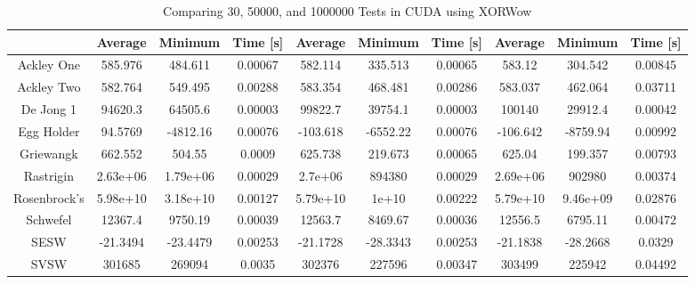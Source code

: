 \documentclass{article}
\begin{document}
        \begin{table}[h]
            \begin{centering}
                \begin{tabular}{|c||c|c|c||c|c|c||c|c|c|}
                    \hline
                                & Average & Minimum & Time [s] & Average & Minimum & Time [s] & Average & Minimum & Time [s] \\
                    \hline
                    \hline
                    Ackley One & 585.976 & 484.611 & 0.00067 & 582.114 & 335.513 & 0.00065 & 583.12 & 304.542 & 0.00845 \\ 
                    \hline
                    Ackley Two & 582.764 & 549.495 & 0.00288 & 583.354 & 468.481 & 0.00286 & 583.037 & 462.064 & 0.03711 \\
                    \hline
                    De Jong 1 & 94620.3 & 64505.6 & 0.00003 & 99822.7 & 39754.1 & 0.00003 & 100140 & 29912.4 & 0.00042\\
                    \hline
                    Egg Holder & 94.5769 & -4812.16 & 0.00076 & -103.618 & -6552.22 & 0.00076 & -106.642 & -8759.94 & 0.00992 \\
                    \hline
                    Griewangk & 662.552 & 504.55 & 0.0009 & 625.738 & 219.673 & 0.00065 & 625.04 & 199.357 & 0.00793 \\
                    \hline
                    Rastrigin & 2.63e+06 & 1.79e+06 & 0.00029 & 2.7e+06 & 894380 & 0.00029 & 2.69e+06 & 902980 & 0.00374 \\
                    \hline
                    Rosenbrock's & 5.98e+10 & 3.18e+10 & 0.00127 & 5.79e+10 & 1e+10 & 0.00222 & 5.79e+10 & 9.46e+09 & 0.02876\\
                    \hline
                    Schwefel & 12367.4 & 9750.19 & 0.00039 & 12563.7 & 8469.67 & 0.00036 & 12556.5 & 6795.11 & 0.00472 \\
                    \hline
                    SESW & -21.3494 & -23.4479 & 0.00253 & -21.1728 & -28.3343 & 0.00253 & -21.1838 & -28.2668 & 0.0329 \\
                    \hline
                    SVSW & 301685 & 269094 & 0.0035 & 302376 & 227596 & 0.00347 & 303499 & 225942 & 0.04492 \\
                    \hline
                \end{tabular}
                \caption{Comparing 30, 50000, and 1000000 Tests in CUDA using XORWow}
            \end{centering}
            \end{table}
\end{document}
